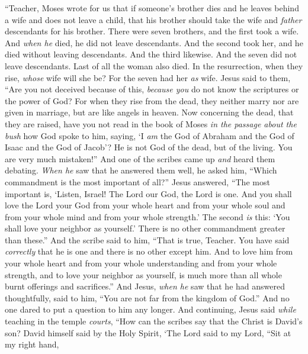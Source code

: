 \begin{biblechapter}
\verse “Teacher, Moses wrote for us that if someone’s brother dies and he leaves behind a wife and does not leave a child, that his brother should take the wife and \textit{father} descendants for his brother.
\verse There were seven brothers, and the first took a wife. And \textit{when he} died, he did not leave descendants.
\verse And the second took her, and he died without leaving descendants. And the third likewise.
\verse And the seven did not leave descendants. Last of all the woman also died.
\verse In the resurrection, when they rise, \textit{whose} wife will she be? For the seven had her \textit{as} wife.
\verse Jesus said to them, “Are you not deceived because of this, \textit{because you} do not know the scriptures or the power of God?
\verse For when they rise from the dead, they neither marry nor are given in marriage, but are like angels in heaven.
\verse Now concerning the dead, that they are raised, have you not read in the book of Moses \textit{in the passage about the bush} how God spoke to him, saying, ‘I \textit{am} the God of Abraham and the God of Isaac and the God of Jacob’?
\verse He is not God of the dead, but of the living. You are very much mistaken!”
 And one of the scribes came up \textit{and} heard them debating. \textit{When he} saw that he answered them well, he asked him, “Which commandment is the most important of all?”
\verse Jesus answered, “The most important is, ‘Listen, Israel! The Lord our God, the Lord is one.
\verse And you shall love the Lord your God from your whole heart and from your whole soul and from your whole mind and from your whole strength.’
\verse The second \textit{is} this: ‘You shall love your neighbor as yourself.’ There is no other commandment greater than these.”
\verse And the scribe said to him, “That is true, Teacher. You have said \textit{correctly} that he is one and there is no other except him.
\verse And to love him from your whole heart and from your whole understanding and from your whole strength, and to love your neighbor as yourself, is much more than all whole burnt offerings and sacrifices.”
\verse And Jesus, \textit{when he} saw that he had answered thoughtfully, said to him, “You are not far from the kingdom of God.” And no one dared to put a question to him any longer.
 And continuing, Jesus said \textit{while} teaching in the temple \textit{courts}, “How can the scribes say that the Christ is David’s son?
\verse David himself said by the Holy Spirit, ‘The Lord said to my Lord, 
“Sit at my right hand, 

\end{biblechapter}
